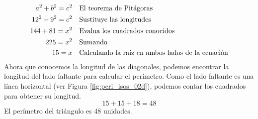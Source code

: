 \begin{solutionbox}{16cm}
\begin{minipage}{0.65\textwidth}
        \begin{align*}
            a^2+b^2  =c^2  & \text{\quad El teorema de Pitágoras}                          \\
            12^2+9^2  =c^2 & \text{\quad Sustituye las longitudes}                         \\
            144 +81 =x^2   & \text{\quad Evalua los cuadrados conocidos}                   \\
            225=x^2        & \text{\quad Sumando }                                         \\
            15=x           & \text{\quad Calculando la raíz en ambos lados de la ecuación} \\
        \end{align*}
        Ahora que conocemos la longitud de las diagonales, podemos encontrar la longitud del lado faltante para calcular el perímetro.
        Como el lado faltante es una línea horizontal (ver Figura \ref{fig:peri_isos_02d}), podemos contar los cuadrados para obtener su longitud.
        \[15+15+18=48\]
        El perímetro del triángulo es 48 unidades.
    \end{minipage}
\end{solutionbox}
